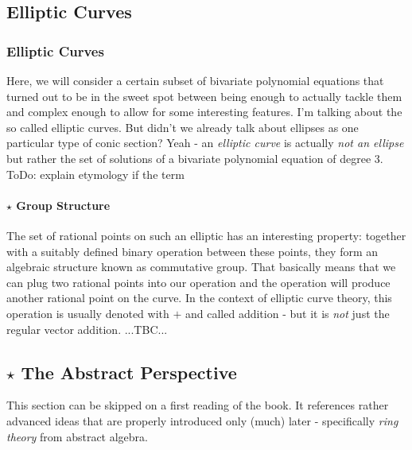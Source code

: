 \subsection{Elliptic Curves}

\subsubsection{Elliptic Curves} 
Here, we will consider a certain subset of bivariate polynomial equations that turned out to be in the sweet spot between being enough to actually tackle them and complex enough to allow for some interesting features. I'm talking about the so called elliptic curves. But didn't we already talk about ellipses as one particular type of conic section? Yeah - an \emph{elliptic curve} is actually \emph{not an ellipse} but rather the set of solutions of a bivariate polynomial equation of degree 3. ToDo: explain etymology if the term

\paragraph{$\star$ Group Structure} %
The set of rational points on such an elliptic has an interesting property: together with a suitably defined binary operation between these points, they form an algebraic structure known as commutative group. That basically means that we can plug two rational points into our operation and the operation will produce another rational point on the curve. In the context of elliptic curve theory, this operation is usually denoted  with $+$ and called addition - but it is \emph{not} just the regular vector addition. ...TBC...




\subsection{$\star$ The Abstract Perspective}
This section can be skipped on a first reading of the book. It references rather advanced ideas that are properly introduced only (much) later - specifically \emph{ring theory} from abstract algebra.




